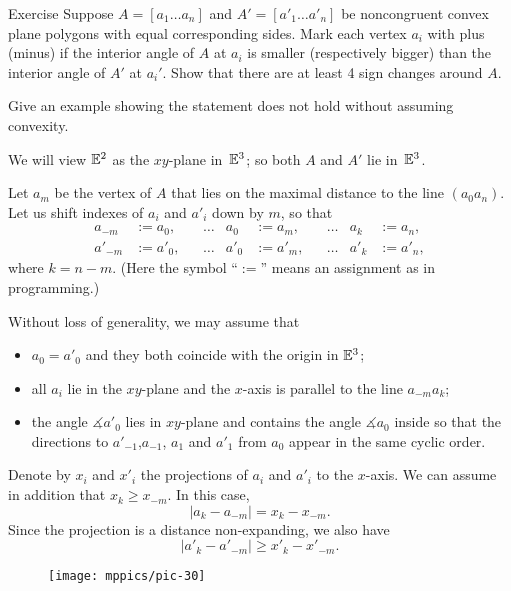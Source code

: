 \begin{thm}{Exercise}\label{ex:cauchy}
Suppose $A=[a_1\dots a_n]$ and $A'=[a'_1\dots a'_n]$ be noncongruent convex plane polygons with equal corresponding sides.
Mark each vertex $a_i$ with plus (minus) if the interior angle of $A$ at $a_i$ is smaller (respectively bigger) than the interior angle of $A'$ at $a_i'$.
Show that there are at least 4 sign changes around $A$. %

Give an example showing the statement does not hold without assuming convexity.

\end{thm}

We will view $\mathbb{E}^2$ as the $xy$-plane in~$\mathbb{E}^3$; 
so both $A$ and $A'$ lie in~$\mathbb{E}^3$.

Let $a_m$ be the vertex of $A$ that lies on the maximal distance to the line $(a_0a_n)$.
Let us shift indexes of $a_i$ and $a'_i$ down by $m$,
so that 
\begin{align*}
a_{-m}&:=a_0,
&&\dots
&
a_{0}&:=a_m,
&&\dots
&
a_k&:=a_n,
\\
a'_{-m}&:=a'_0,
&&\dots
&
a'_{0}&:=a'_m,
&&\dots
&
a'_k&:=a'_n,
\end{align*}
where $k=n-m$.
(Here the symbol ``$:=$'' means an assignment as in programming.)

Without loss of generality, we may assume that
\begin{itemize}
\item $a_0=a'_0$ and they both coincide with the origin in $\mathbb{E}^3$;
\item all $a_i$ lie in the $xy$-plane and the $x$-axis is parallel to the line $a_{-m}a_k$;
\item the angle $\measuredangle a'_0$ lies in $xy$-plane and contains the angle $\measuredangle a_0$ inside so that the directions to $a'_{-1}$,$a_{-1}$, $a_{1}$ and $a'_{1}$ from $a_0$ appear in the same cyclic order.
\end{itemize}

Denote by $x_i$ and $x'_i$ the projections of $a_i$ and $a'_i$ to the $x$-axis.
We can assume in addition that $x_k\ge x_{-m}$.
In this case,
$$|a_k-a_{-m}|=x_k-x_{-m}.$$
Since the projection is a distance non-expanding, we also have
$$|a'_k-a'_{-m}|\ge x'_k-x'_{-m}.$$ 

\begin{wrapfigure}{r}{60mm}
\vskip-5mm
\centering
\texttt{[image: mppics/pic-30]}
\vskip3mm
\end{wrapfigure}

